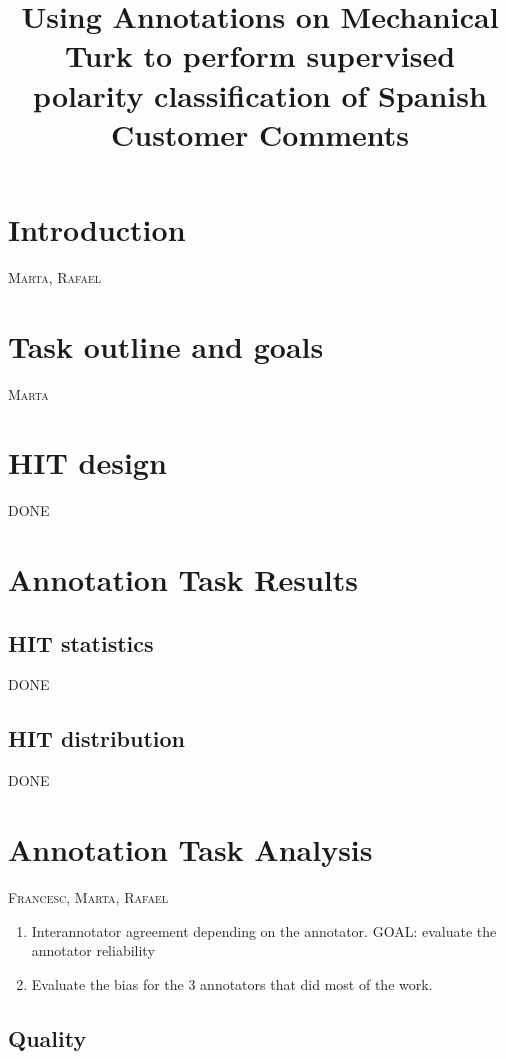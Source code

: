 \documentclass[11pt, a4paper,onecolumn]{article}
\title{Using Annotations on Mechanical Turk to perform supervised polarity classification of Spanish Customer Comments}
\begin{document}
\maketitleabstract

\section{Introduction}
\label{sec:intro}

\textsc{Marta, Rafael}

\section{Task outline and goals}

\textsc{Marta} 

\section{HIT design}

DONE

\section{Annotation Task Results}

\subsection{HIT statistics}

DONE 

\subsection{HIT distribution}

DONE

\section{Annotation Task Analysis}

\textsc{Francesc, Marta, Rafael}

\begin{enumerate}
\item Interannotator agreement depending on the annotator. GOAL: evaluate the annotator reliability
\item Evaluate the bias for the 3 annotators that did most of the work.
\end{enumerate}


\subsection{Quality}
\end{document}
